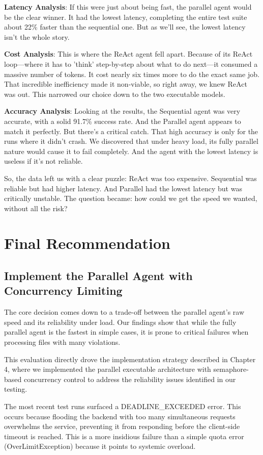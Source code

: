 \begin{spacing}{1.2}
\textbf{Latency Analysis}: If this were just about being fast, the parallel agent would be the clear winner. It had the lowest latency, completing the entire test suite about 22\% faster than the sequential one. But as we'll see, the lowest latency isn't the whole story.

\textbf{Cost Analysis}: This is where the ReAct agent fell apart. Because of its ReAct loop—where it has to 'think' step-by-step about what to do next—it consumed a massive number of tokens. It cost nearly six times more to do the exact same job. That incredible inefficiency made it non-viable, so right away, we knew ReAct was out. This narrowed our choice down to the two executable models.

\textbf{Accuracy Analysis}: Looking at the results, the Sequential agent was very accurate, with a solid 91.7\% success rate. And the Parallel agent appears to match it perfectly. But there's a critical catch. That high accuracy is only for the runs where it didn't crash. We discovered that under heavy load, its fully parallel nature would cause it to fail completely. And the agent with the lowest latency is useless if it's not reliable.

So, the data left us with a clear puzzle: ReAct was too expensive. Sequential was reliable but had higher latency. And Parallel had the lowest latency but was critically unstable. The question became: how could we get the speed we wanted, without all the risk?

\section{Final Recommendation}

\subsection{Implement the Parallel Agent with Concurrency Limiting}
The core decision comes down to a trade-off between the parallel agent's raw speed and its reliability under load. Our findings show that while the fully parallel agent is the fastest in simple cases, it is prone to critical failures when processing files with many violations.

This evaluation directly drove the implementation strategy described in Chapter 4, where we implemented the parallel executable architecture with semaphore-based concurrency control to address the reliability issues identified in our testing.

The most recent test runs surfaced a DEADLINE\_EXCEEDED error. This occurs because flooding the backend with too many simultaneous requests overwhelms the service, preventing it from responding before the client-side timeout is reached. This is a more insidious failure than a simple quota error (OverLimitException) because it points to systemic overload. 


\end{spacing}
